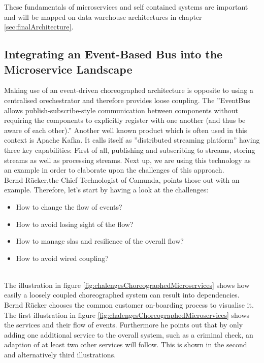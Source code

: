 These fundamentals of microservices and self contained systems are important and will be mapped on data warehouse architectures in chapter \ref{sec:finalArchitecture}.

\subsection{Integrating an Event-Based Bus into the Microservice  Landscape}
\label{sec:eventBasedArchitecture}
Making use of an event-driven choreographed architecture is opposite to using a centralised orechestrator and therefore provides loose coupling. The ''EventBus allows publish-subscribe-style communication between components without requiring the components to explicitly register with one another (and thus be aware of each other).'' \cite{EventBusExplained} \newline
Another well known product which is often used in this context is Apache Kafka. It calls itself as ''distributed streaming platform'' having three key capabilities: First of all, publishing and subscribing to streams, storing streams as well as processing streams.\cite{kafka}
Next up, we are using this technology as an example in order to elaborate upon the challenges of this approach.\newline
\\
Bernd Rücker,the Chief Technologist of Camunda, points those out with an example. Therefore, let's start by having a look at the challenges:
\begin{itemize}
    \item How to change the flow of events?
    \item How to avoid losing sight of the flow?
    \item How to manage \acrshort{sla}s and resilience of the overall flow?
    \item How to avoid wired coupling?
\end{itemize}
\cite{eventDrivenMicroservices}\newline
\\
The illustration in figure \ref{fig:chalengesChoreographedMicroservices} shows how easily a loosely coupled choreographed system can result into dependencies. Bernd Rücker chooses the common customer on-boarding process to visualise it. The first illustration in figure \ref{fig:chalengesChoreographedMicroservices} shows the services and their flow of events. Furthermore he points out that by only adding one additional service to the overall system, such as a criminal check, an adaption of at least two other services will follow. This is shown in the second and alternatively third illustrations.\cite{eventDrivenMicroservices}\newline
